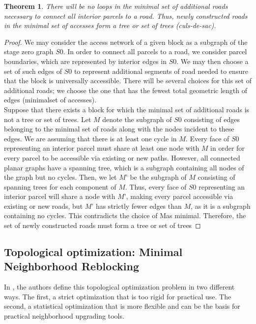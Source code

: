 \documentclass[10pt]{article}
\newtheorem{theorem}{Theorem}
\begin{document}
\begin{theorem}
    There will be no loops in the minimal set of additional roads necessary to connect all interior parcels to a road. Thus, newly constructed roads in the minimal set of accesses form a tree or set of trees (culs-de-sac).
\end{theorem}
\begin{proof}
We may consider the access network of a given block as a subgraph of the stage zero graph $S0$. In order to connect all parcels to a road, we consider parcel boundaries, which are represented by interior edges in $S0$. We may then choose a set of such edges of $S0$ to represent additional segments of road needed to ensure that the block is universally accessible. There will be several choices for this set of additional roads; we choose the one that has the fewest total geometric length of edges (minimalset of accesses).\\

Suppose that there exists a block for which the minimal set of additional roads is not a tree or set of trees. Let $M$ denote the subgraph of $S0$ consisting of edges belonging to the minimal set of roads along with the nodes incident to these edges. We are assuming that there is at least one cycle in $M$. Every face of $S0$ representing an interior parcel must share at least one node with $M$ in order for every parcel to be accessible via existing or new paths. However, all connected planar graphs have a spanning tree, which is a subgraph containing all nodes of the graph but no cycles. Then, we let $M’$ be the subgraph of $M$ consisting of spanning trees for each component of $M$. Thus, every face of $S0$ representing an interior parcel will share a node with $M’$, making every parcel accessible via existing or new roads, but $M’$ has strictly fewer edges than $M$, as it is a subgraph containing no cycles. This contradicts the choice of Mas minimal. Therefore, the set of newly constructed roads must form a tree or set of trees
\end{proof}

\subsection{Topological optimization: Minimal Neighborhood Reblocking}

 In \cite{bre}, the authors define this topological optimization problem in two different ways. The first, a strict optimization that is too rigid for practical use. The second, a statistical optimization that is more flexible and can be the basis for practical neighborhood upgrading tools.\\
\end{document}
